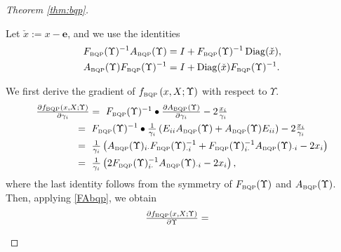 \documentclass[smallextended]{svjour3hack}       %
\makeatletter
\DeclareMathOperator{\Diag}{Diag}
\DeclareMathOperator{\diag}{diag}
\renewcommand*{\top}{%
  {\mathpalette\@transpose{}}%
}
\newcommand*{\@transpose}[2]{%
  \raisebox{\depth}{$\m@th#1\mathsf{T}$}%
}
\makeatother
\begin{document}
\begin{proof}[Theorem \ref{thm:bqp}]
\begin{itemize}
    Let $\check{x}:=x-\mathbf{e}$, and we  use the identities
      \begin{align}
     &F_{{\tiny\mbox{BQP}}}(\Upsilon)^{-1}A_{{\tiny\mbox{BQP}}}(\Upsilon) = I + F_{{\tiny\mbox{BQP}}}(\Upsilon)^{-1}\Diag(\check{x}), \label{FAbqp}\\ &A_{{\tiny\mbox{BQP}}}(\Upsilon)F_{{\tiny\mbox{BQP}}}(\Upsilon)^{-1} = I + \Diag(\check{x})F_{{\tiny\mbox{BQP}}}(\Upsilon)^{-1}.\label{AFbqp}
    \end{align}

  We first derive the gradient of $f_{{\tiny\mbox{BQP}}}\left(x,X;\Upsilon\right)$ with respect to $\Upsilon$.
    \begin{align*}
         &\textstyle\frac{\partial f_{{\tiny\mbox{BQP}}}\left(x,X;\Upsilon\right)}{\partial \gamma_i}
         = ~ F_{{\tiny\mbox{BQP}}}(\Upsilon)^{-1}\bullet \frac{\partial A_{{\tiny\mbox{BQP}}}(\Upsilon)}{\partial \gamma_i} -2\frac{x_i}{\gamma_i}\\
        & \qquad \qquad= ~F_{{\tiny\mbox{BQP}}}(\Upsilon)^{-1}\bullet \textstyle\frac{1}{\gamma_i}\left(E_{ii}A_{{\tiny\mbox{BQP}}}(\Upsilon)+A_{{\tiny\mbox{BQP}}}(\Upsilon) E_{ii}\right)-2\textstyle\frac{x_i}{\gamma_i}\\
    &\qquad\qquad = ~\textstyle\frac{1}{\gamma_i}\left(A_{{\tiny\mbox{BQP}}}(\Upsilon)_{i\cdot}F_{{\tiny\mbox{BQP}}}(\Upsilon)^{-1}_{\cdot i}+F_{{\tiny\mbox{BQP}}}(\Upsilon)^{-1}_{i\cdot}A_{{\tiny\mbox{BQP}}}(\Upsilon)_{\cdot i}-2x_i\right)\\
    &\qquad\qquad =~ \textstyle \frac{1}{\gamma_i}\left(2F_{{\tiny\mbox{BQP}}}(\Upsilon)^{-1}_{i\cdot}A_{{\tiny\mbox{BQP}}}(\Upsilon)_{\cdot i}-2x_i\right),
    \end{align*}
    where the last identity follows from the symmetry of  $F_{{\tiny\mbox{BQP}}}(\Upsilon)$ and $A_{{\tiny\mbox{BQP}}}(\Upsilon)$. Then, applying \eqref{FAbqp}, we obtain
    \begin{align*}
        &\textstyle\frac{\partial f_{{\tiny\mbox{BQP}}}\left(x,X;\Upsilon\right)}{\partial \Upsilon}=

\end{align*}
\end{itemize}
\end{proof}
\end{document}
